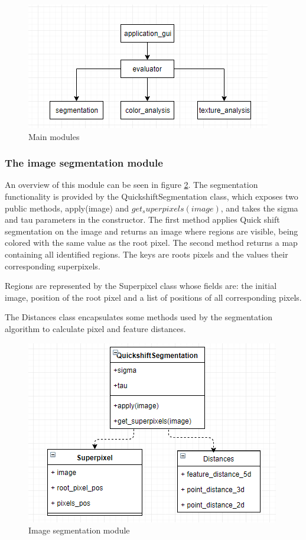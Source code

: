 \documentclass[12pt]{report}
\begin{document}
	\begin{figure}[h!]
		\centering
		\includegraphics[]{design/main_modules.png}
		\caption{Main modules}
		\label{fig:main_modules}
	\end{figure}

	\subsubsection{The image segmentation module}
	An overview of this module can be seen in figure \ref{fig:image_segmentation}. The segmentation functionality is provided by the QuickshiftSegmentation class, which exposes two public methods, apply(image) and $get_superpixels(image)$, and takes the sigma and tau parameters in the constructor. The first method applies Quick shift segmentation on the image and returns an image where regions are visible, being colored with the same value as the root pixel. The second method returns a map containing all identified regions. The keys are roots pixels and the values their corresponding superpixels. 
	
	Regions are represented by the Superpixel class whose fields are: the initial image, position of the root pixel and a list of positions of all corresponding pixels.
	
	The Distances class encapsulates some methods used by the segmentation algorithm to calculate pixel and feature distances.
	
	\begin{figure}[h!]
		\centering
		\includegraphics[]{design/image_segmentation.png}
		\caption{Image segmentation module}
		\label{fig:image_segmentation}
	\end{figure}
\end{document}
